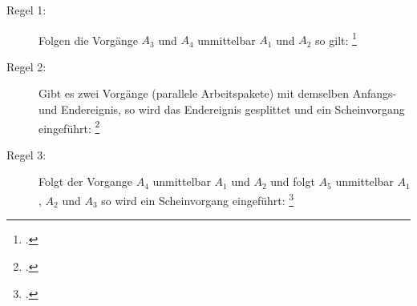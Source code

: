 \documentclass{lehramt-informatik-haupt}
\begin{document}
\begin{description}

\item[Regel 1:] Folgen die Vorgänge $A_3$ und $A_4$ unmittelbar $A_1$
und $A_2$ so gilt:
\footcite[Seite 24]{sosy:fs:3}

\begin{center}
\end{center}

\item[Regel 2:] Gibt es zwei Vorgänge (parallele Arbeitspakete) mit
demselben Anfangs- und Endereignis, so wird das Endereignis gesplittet
und ein Scheinvorgang eingeführt:
\footcite[Seite 25]{sosy:fs:3}

\begin{center}
\end{center}

\item[Regel 3:] Folgt der Vorgange $A_4$ unmittelbar $A_1$ und $A_2$ und
folgt $A_5$ unmittelbar $A_1$ , $A_2$ und $A_3$ so wird ein
Scheinvorgang eingeführt:
\footcite[Seite 26]{sosy:fs:3}
\end{description}

\begin{center}
\end{center}
\end{document}

